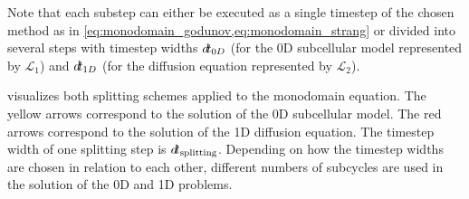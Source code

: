 Note that each substep can either be executed as a single timestep of the chosen method as in \cref{eq:monodomain_godunov,eq:monodomain_strang} or divided into several steps with timestep widths $\dt_{0D}$ (for the 0D subcellular model represented by $\mathcal{L}_1$) and $\dt_{1D}$ (for the diffusion equation represented by $\mathcal{L}_2$).

 visualizes both splitting schemes applied to the monodomain equation. 
The yellow arrows correspond to the solution of the 0D subcellular model. The red arrows correspond to the solution of the 1D diffusion equation. The timestep width of one splitting step is $\dt_\text{splitting}$. Depending on how the timestep widths are chosen in relation to each other, different numbers of subcycles are used in the solution of the 0D and 1D problems.

